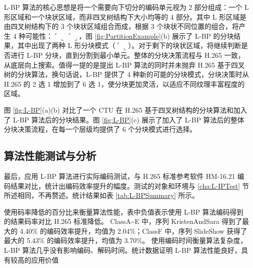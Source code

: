 L-BP 算法的核心思想是将一个需要向下切分的编码单元视为 2 部分组成：一个 L 形区域和一个块状区域，而非四叉树结构下大小均等的 4 部分。其中 L 形区域是由四叉树结构下的 3 个块状区域组合而成，根据 3 个块状不同位置的组合，将产生 4 种可能性：$\ulcorner \llcorner \urcorner \lrcorner$，图 \ref{fig:PartitionExample}(b) 展示了 L-BP 的分块结果，其中出现了两种 L 形分块模式（$\ulcorner \llcorner$）。对于剩下的块状区域，将继续判断是否进行 L-BP 分块，直到分割到最小单元。整体的分块决策流程与 H.265 一致，从底层向上搜索。值得一提的是提出 L-BP 算法的同时并未抛弃 H.265 基于四叉树的分块算法，换句话说，L-BP 提供了 4 种新的可能的分块模式，分块决策时从 H.265 的 2 选 1 增加到了 6 选 1，使分块更加灵活，以适应不同纹理丰富程度的区域。

图 \ref{fig:L-BP}(a)(b) 对比了一个 CTU 在 H.265 基于四叉树结构的分块算法和加入了 L-BP 算法后的分块结果。图 \ref{fig:L-BP}(c) 展示了加入了 L-BP 算法后的整体分块决策流程，在每一个层级均提供了 6 个分块模式进行选择。
\begin{figure}[!p]
\end{figure}

\subsection{算法性能测试与分析}
最后，应用 L-BP 算法进行实际编码测试，与 H.265 标准参考软件 HM-16.21 编码结果对比，统计出编码效率提升的幅度。测试的对象和环境与 \ref{cha:L-IPTest} 节所述相同，不再赘述。统计结果如表 \ref{tab:L-BPSummary} 所示。

使用码率降低的百分比来衡量算法性能，表中负值表示使用 L-BP 算法编码得到的结果码率对比 H.265 标准降低。
ClassA\textasciitilde E 中，序列 KristenAndSara 得到了最大的 4.40\% 的编码效率提升，均值为 2.04\%；ClassF 中，序列 SlideShow 获得了最大的 5.43\% 的编码效率提升，均值为 3.70\%。
使用编码时间衡量算法复杂度，L-BP 算法几乎没有影响编码、解码时间。统计数据证明 L-BP 算法性能良好，具有较高的应用价值

